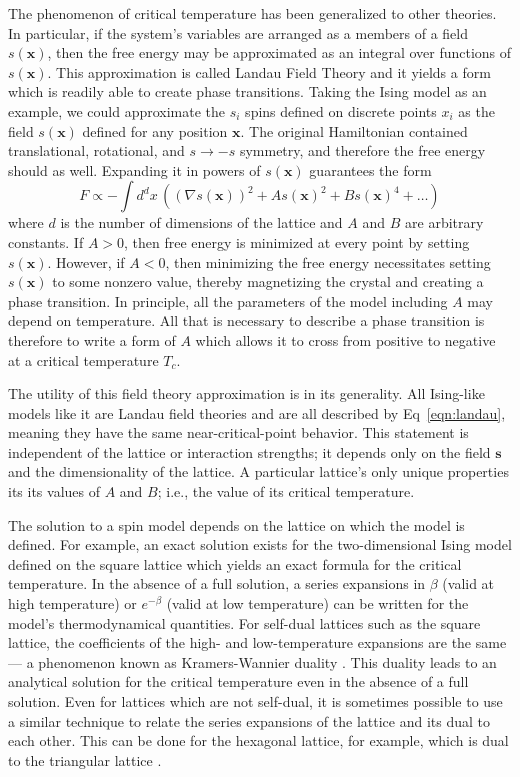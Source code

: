 \documentclass[amsmath,amssymb,aps,twocolumn,nofootinbib]{revtex4-2}
\newcommand{\parens}[1]{\left ( #1 \right )}
\begin{document}
The phenomenon of critical temperature has been generalized to other theories. In particular, if the system's variables are arranged as a members of a field $s(\bm x)$, then the free energy may be approximated as an integral over functions of $s(\bm x)$. This approximation is called Landau Field Theory and it yields a form which is readily able to create phase transitions. Taking the Ising model as an example, we could approximate the $s_i$ spins defined on discrete points $x_i$ as the field $s(\bm x)$ defined for any position $\bm x$. The original Hamiltonian contained translational, rotational, and $s\rightarrow-s$ symmetry, and therefore the free energy should as well. Expanding it in powers of $s(\bm x)$ guarantees the form
\begin{equation}
F \propto -\int d^d x \, \parens{(\nabla s(\bm x))^2 + A s(\bm x)^2 + B s(\bm x)^4 + \dots}
\label{eqn:landau}
\end{equation}
where $d$ is the number of dimensions of the lattice and $A$ and $B$ are arbitrary constants. If $A>0$, then free energy is minimized at every point by setting $s(\bm x)$. However, if $A<0$, then minimizing the free energy necessitates setting $s(\bm x)$ to some nonzero value, thereby magnetizing the crystal and creating a phase transition. In principle, all the parameters of the model including $A$ may depend on temperature. All that is necessary to describe a phase transition is therefore to write a form of $A$ which allows it to cross from positive to negative at a critical temperature $T_c$.

The utility of this field theory approximation is in its generality. All Ising-like models like it are Landau field theories and are all described by Eq~\ref{eqn:landau}, meaning they have the same near-critical-point behavior. This statement is independent of the lattice or interaction strengths; it depends only on the field $\bm s$ and the dimensionality of the lattice. A particular lattice's only unique properties its its values of $A$ and $B$; i.e., the value of its critical temperature.

The solution to a spin model depends on the lattice on which the model is defined. For example, an exact solution exists for the two-dimensional Ising model defined on the square lattice which yields an exact formula for the critical temperature. In the absence of a full solution, a series expansions in $\beta$ (valid at high temperature) or $e^{-\beta}$ (valid at low temperature) can be written for the model's thermodynamical quantities. For self-dual lattices such as the square lattice, the coefficients of the high- and low-temperature expansions are the same --- a phenomenon known as Kramers-Wannier duality \cite{kramers}. This duality leads to an analytical solution for the critical temperature even in the absence of a full solution. Even for lattices which are not self-dual, it is sometimes possible to use a similar technique to relate the series expansions of the lattice and its dual to each other. This can be done for the hexagonal lattice, for example, which is dual to the triangular lattice \cite{bhattacharjee1995fifty}.
\end{document}
